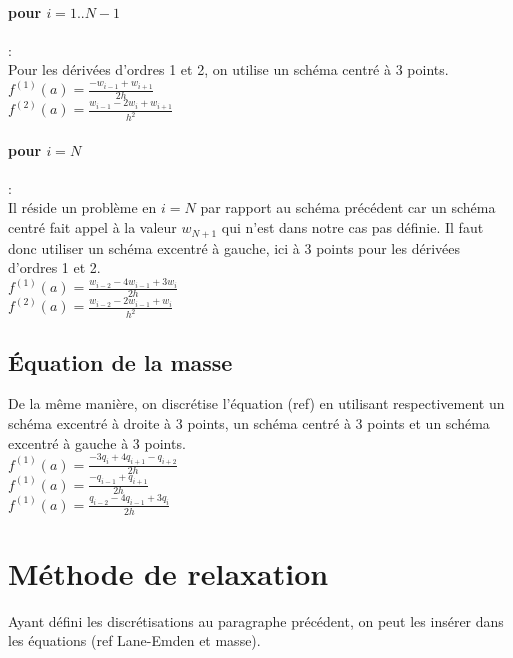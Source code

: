 \documentclass[a4paper,10pt]{article}
\begin{document}
\paragraph{pour $i=1..N-1$}: \\
Pour les dérivées d'ordres 1 et 2, on utilise un schéma centré à 3 points.\\
$f^{(1)} (a) = \frac{-w_{i-1}+w_{i+1}}{2 h}$\\
$f^{(2)} (a) = \frac{w_{i-1}-2 w_i+w_{i+1}}{h^2}$

\paragraph{pour $i=N$}: \\
Il réside un problème en $i=N$ par rapport au schéma précédent car un schéma centré fait appel à la valeur $w_{N+1}$ qui n'est dans notre cas pas définie. Il faut donc utiliser un schéma excentré à gauche, ici à 3 points pour les dérivées d'ordres 1 et 2.\\
$f^{(1)} (a) = \frac{w_{i-2}-4 w_{i-1}+3 w_i}{2 h}$\\
$f^{(2)} (a) = \frac{w_{i-2}-2 w_{i-1}+w_i}{h^2}$


\subsection{Équation de la masse}
De la même manière, on discrétise l'équation (ref) en utilisant respectivement un schéma excentré à droite à 3 points, un schéma centré à 3 points et un schéma excentré à gauche à 3 points.\\
$f^{(1)} (a) = \frac{-3 q_i + 4 q_{i+1} - q_{i+2}}{2 h}$\\
$f^{(1)} (a) = \frac{-q_{i-1}+q_{i+1}}{2 h}$\\
$f^{(1)} (a) = \frac{q_{i-2}-4 q_{i-1}+3 q_i}{2 h}$\\


\section{Méthode de relaxation}
Ayant défini les discrétisations au paragraphe précédent, on peut les insérer dans les équations (ref Lane-Emden et masse).
\end{document}
